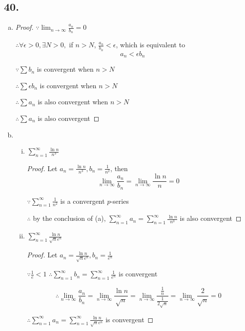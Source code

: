 \documentclass{article}
\begin{document}
    \subsection*{40.}

    \begin{enumerate}[(a)]
        \item \begin{proof}
            $\because \lim_{n\to\infty}\frac{a_n}{b_n} = 0$

            $\therefore \forall \epsilon > 0, \exists N > 0,$ if $n > N$, $\frac{a_n}{b_n} < \epsilon$, which is equivalent to $$a_n < \epsilon b_n$$

            $\because \sum b_n$ is convergent when $n>N$

            $\therefore \sum \epsilon b_n$ is convergent when $n>N$

            $\therefore \sum a_n$ is also convergent when $n>N$

            $\therefore \sum a_n$ is also convergent
        \end{proof}

        \item 
        \begin{enumerate}[(i)]
            \item $\sum_{n=1}^\infty \frac{\ln n}{n^3}$
            \begin{proof}

            Let $a_n = \frac{\ln n}{n^3}, b_n = \frac{1}{n^2}$, then $$\lim_{n\to\infty}\frac{a_n}{b_n} = \lim_{n\to\infty}\frac{\ln n}{n} = 0$$

            $\because \sum_{n=1}^\infty \frac{1}{n^2}$ is a convergent $p$-series

            $\therefore$ by the conclusion of (a), $\sum_{n=1}^\infty a_n = \sum_{n=1}^\infty \frac{\ln n}{n^3}$ is also convergent
            \end{proof}
            \item $\sum_{n=1}^\infty \frac{\ln n}{\sqrt n e^n}$
            \begin{proof}

            Let $a_n = \frac{\ln n}{\sqrt n e^n}, b_n = \frac{1}{e^n}$

            $\because \frac 1 e < 1$ $\therefore \sum_{n=1}^\infty b_n = \sum_{n=1}^\infty \frac{1}{e^n}$ is convergent

            $$\therefore \lim_{n\to \infty}\frac{a_n}{b_n} = \lim_{n\to\infty}\frac{\ln n}{\sqrt n} = \lim_{n\to\infty}\frac{\frac 1 n}{\frac{1}{2\sqrt n}} = \lim_{n\to\infty}\frac{2}{\sqrt n} = 0$$

            $\therefore \sum_{n=1}^\infty a_n = \sum_{n=1}^\infty \frac{\ln n}{\sqrt n e^n}$ is convergent
                
            \end{proof}

        \end{enumerate}

    \end{enumerate}
\end{document}
